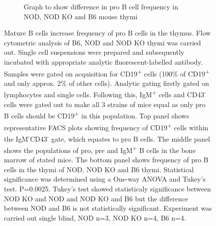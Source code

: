 \begin{figure}
\begin{subfigure}{\textwidth}
	\caption{Graph to show difference in pro B cell frequency in NOD, NOD KO and B6 mouse thymi}
	\label{subfig:MatureBincproBgraph}
	\end{subfigure}
\caption[NOD mice have an increased frequency of pro B cells compared to NOD KO thymi]{Mature B cells increase frequency of pro B cells in the thymus.
Flow cytometric analysis of B6, NOD and NOD KO thymi was carried out.
Single cell suspensions were prepared and subsequently incubated with appropriate analytic fluorescent-labelled antibody.
Samples were gated on acquisition for CD19\textsuperscript{+} cells (100\% of CD19\textsuperscript{+} and only approx. 2\% of other cells).
Analytic gating firstly gated on lymphocytes and single cells.
Following this, IgM\textsuperscript{+} cells and CD43\textsuperscript{-} cells were gated out to make all 3 strains of mice equal as only pro B cells should be CD19\textsuperscript{+} in this population. 
Top panel shows representative FACS plots showing frequency of CD19\textsuperscript{+} cells within the IgM\textsuperscript{-}CD43\textsuperscript{-} gate, which equates to pro B cells.
The middle panel shows the populations of pro, pre and IgM\textsuperscript{+} B cells in the bone marrow of stated mice.
The bottom panel shows frequency of pro B cells in the thymi of NOD, NOD KO and B6 thymi.
Statistical significance was determined using a One-way ANOVA and Tukey's test. P=0.0025. Tukey's test showed statisticaly significance between NOD KO and NOD and NOD KO and B6 but the difference between NOD and B6 is not statistically significant.
Experiment was carried out single blind, NOD n=3, NOD KO n=4, B6 n=4.}
\label{fig:MatureBincProB}
\end{figure}




